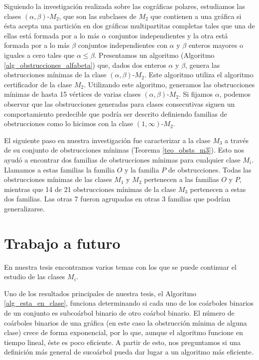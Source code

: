 Siguiendo la investigación realizada sobre las cográficas polares, estudiamos las clases $(\alpha, \beta)$-$M_2$, que son las subclases de $M_2$ que contienen a una gráfica si ésta acepta una partición en dos gráficas multipartitas completas tales que una de ellas está formada por a lo más $\alpha$ conjuntos independientes y la otra está formada por a lo más $\beta$ conjuntos independientes con $\alpha$ y $\beta$ enteros mayores o iguales a cero tales que $\alpha \le \beta$. Presentamos un algoritmo (Algoritmo \ref{alg_obstrucciones_alfabeta}) que, dados dos enteros $\alpha$ y $\beta$, genera las obstrucciones mínimas de la clase $(\alpha, \beta)$-$M_2$. Este algoritmo utiliza el algoritmo certificador de la clase $M_2$. Utilizando este algoritmo, generamos las obstrucciones mínimas de hasta 15 vértices de varias clases $(\alpha, \beta)$-$M_2$. Si fijamos $\alpha$, podemos observar que las obstrucciones generadas para clases consecutivas siguen un comportamiento predecible que podría ser descrito definiendo familias de obstrucciones como lo hicimos con la clase $(1,\infty)$-$M_2$.

El siguiente paso en nuestra investigación fue caracterizar a la clase $M_3$ a través de su conjunto de obstrucciones mínimas (Teorema \ref{teo_obsts_m3}). Esto nos ayudó a encontrar dos familias de obstrucciones mínimas para cualquier clase $M_i$. Llamamos a estas familias la familia $O$ y la familia $P$ de obstrucciones. Todas las obstrucciones mínimas de las clases $M_1$ y $M_2$ pertenecen a las familias $O$ y $P$, mientras que 14 de 21 obstrucciones mínimas de la clase $M_3$ pertenecen a estas dos familias. Las otras 7 fueron agrupadas en otras 3 familias que podrían generalizarse.  

\section{Trabajo a futuro}

En nuestra tesis encontramos varios temas con los que se puede continuar el estudio de las clases $M_i$.

Uno de los resultados principales de nuestra tesis, el Algoritmo \ref{alg_esta_en_clase}, funciona determinando si cada uno de los coárboles binarios de un conjunto es subcoárbol binario de otro coárbol binario. El número de coárboles binarios de una gráfica (en este caso la obstrucción mínima de alguna clase) crece de forma exponencial, por lo que, aunque el algoritmo funcione en tiempo lineal, éste es poco eficiente. A partir de esto, nos preguntamos si una definición más general de sucoárbol pueda dar lugar a un algoritmo más eficiente. 

